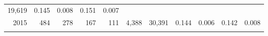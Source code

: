 \documentclass[]{article}
\begin{document}
\begin{longtable}[]{@{}rrrrrrrrrrr@{}}
\begin{minipage}[t]{0.05\columnwidth}
19,619\strut
\end{minipage} & \begin{minipage}[t]{0.09\columnwidth}\raggedleft\strut
0.145\strut
\end{minipage} & \begin{minipage}[t]{0.05\columnwidth}\raggedleft\strut
0.008\strut
\end{minipage} & \begin{minipage}[t]{0.10\columnwidth}\raggedleft\strut
0.151\strut
\end{minipage} & \begin{minipage}[t]{0.04\columnwidth}\raggedleft\strut
0.007\strut
\end{minipage}\tabularnewline
\begin{minipage}[t]{0.06\columnwidth}\raggedleft\strut
2015\strut
\end{minipage} & \begin{minipage}[t]{0.07\columnwidth}\raggedleft\strut
484\strut
\end{minipage} & \begin{minipage}[t]{0.07\columnwidth}\raggedleft\strut
278\strut
\end{minipage} & \begin{minipage}[t]{0.07\columnwidth}\raggedleft\strut
167\strut
\end{minipage} & \begin{minipage}[t]{0.07\columnwidth}\raggedleft\strut
111\strut
\end{minipage} & \begin{minipage}[t]{0.07\columnwidth}\raggedleft\strut
4,388\strut
\end{minipage} & \begin{minipage}[t]{0.05\columnwidth}\raggedleft\strut
30,391\strut
\end{minipage} & \begin{minipage}[t]{0.09\columnwidth}\raggedleft\strut
0.144\strut
\end{minipage} & \begin{minipage}[t]{0.05\columnwidth}\raggedleft\strut
0.006\strut
\end{minipage} & \begin{minipage}[t]{0.10\columnwidth}\raggedleft\strut
0.142\strut
\end{minipage} & \begin{minipage}[t]{0.04\columnwidth}\raggedleft\strut
0.008\strut
\end{minipage}\tabularnewline
\begin{minipage}[t]{0.06\columnwidth}\raggedleft\strut

\end{minipage}
\end{longtable}
\end{document}
